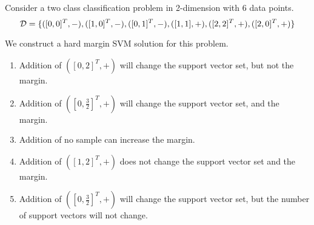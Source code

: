 \begin{frame}
\section{}
Consider a two class classification problem in 2-dimension with 6 data points.
\[ {\cal D} = \{([0,0]^T,-), ([1,0]^T,-), ([0,1]^T,-), ([1,1],+), ([2,2]^T,+), ([2,0]^T,+)  \}\]

We construct a hard margin SVM solution for this problem.

\begin{enumerate}[label=(\Alph*)]
\item Addition of $([0,2]^T,+)$ will change the support vector set, but not the margin.   %
\item Addition of $([0,\frac{3}{2}]^T,+)$ will change the support vector set, and the margin.   %
\item Addition of no sample can increase the margin.    %
\item Addition of $([1,2]^T,+)$ does not change the support vector set and the margin.    %
\item Addition of $([0,\frac{3}{2}]^T,+)$ will change the support vector set, but the number of support vectors will not change.
\end{enumerate}
\end{frame}
